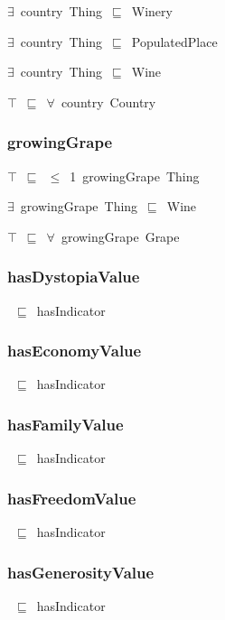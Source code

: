 \documentclass{article}
\begin{document}
\ensuremath{\exists}~country~Thing~\ensuremath{\sqsubseteq}~Winery

\ensuremath{\exists}~country~Thing~\ensuremath{\sqsubseteq}~PopulatedPlace

\ensuremath{\exists}~country~Thing~\ensuremath{\sqsubseteq}~Wine

\ensuremath{\top}~\ensuremath{\sqsubseteq}~\ensuremath{\forall}~country~Country

\subsubsection*{growingGrape}

\ensuremath{\top}~\ensuremath{\sqsubseteq}~\ensuremath{\leq}~1~growingGrape~Thing

\ensuremath{\exists}~growingGrape~Thing~\ensuremath{\sqsubseteq}~Wine

\ensuremath{\top}~\ensuremath{\sqsubseteq}~\ensuremath{\forall}~growingGrape~Grape

\subsubsection*{hasDystopiaValue}

~\ensuremath{\sqsubseteq}~hasIndicator

\subsubsection*{hasEconomyValue}

~\ensuremath{\sqsubseteq}~hasIndicator

\subsubsection*{hasFamilyValue}

~\ensuremath{\sqsubseteq}~hasIndicator

\subsubsection*{hasFreedomValue}

~\ensuremath{\sqsubseteq}~hasIndicator

\subsubsection*{hasGenerosityValue}

~\ensuremath{\sqsubseteq}~hasIndicator
\end{document}
